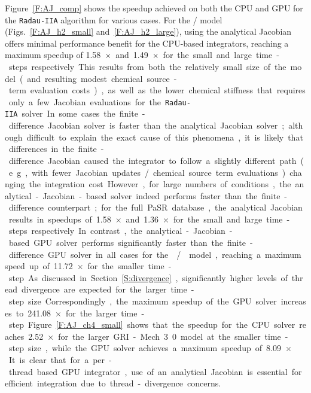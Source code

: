 \documentclass[preprint]{elsarticle}
\begin{document}
Figure~\ref{F:AJ_comp} shows the speedup achieved on both the CPU and GPU for the \texttt{Radau-IIA} algorithm for various cases.
For the \slash{} model (Figs.~\ref{F:AJ_h2_small} and~\ref{F:AJ_h2_large}), using the analytical Jacobian offers minimal performance benefit for the CPU-based integrators, reaching a maximum speedup of \SI{1.58}{$\times$} and \SI{1.49}{$\times$} for the small and large time-steps respectively.
This results from both the relatively small size of the model (and resulting modest chemical source-term evaluation costs), as well as the lower chemical stiffness that requires only a few Jacobian evaluations for the \texttt{Radau-IIA} solver.
In some cases the finite-difference Jacobian solver is faster than the analytical Jacobian solver; although difficult to explain the exact cause of this phenomena, it is likely that differences in the finite-difference Jacobian caused the integrator to follow a slightly different path (e.g., with fewer Jacobian updates\slash chemical source term evaluations) changing the integration cost.
However, for large numbers of conditions, the analytical-Jacobian-based solver indeed performs faster than the finite-difference counterpart; for the full PaSR database, the analytical Jacobian results in speedups of \SI{1.58}{$\times$} and \SI{1.36}{$\times$} for the small and large time-steps respectively.
In contrast, the analytical-Jacobian-based GPU solver performs significantly faster than the finite-difference GPU solver in all cases for the \slash{} model, reaching a maximum speed up of \SI{11.72}{$\times$} for the smaller time-step.
As discussed in Section~\ref{S:divergence}, significantly higher levels of thread divergence are expected for the larger time-step size.
Correspondingly, the maximum speedup of the GPU solver increases to \SI{241.08}{$\times$} for the larger time-step.
Figure~\ref{F:AJ_ch4_small} shows that the speedup for the CPU solver reaches \SI{2.52}{$\times$} for the larger GRI-Mech 3.0 model at the smaller time-step size, while the GPU solver achieves a maximum speedup of \SI{8.09}{$\times$}.
It is clear that for a per-thread based GPU integrator, use of an analytical Jacobian is essential for efficient integration due to thread-divergence concerns.
\end{document}
